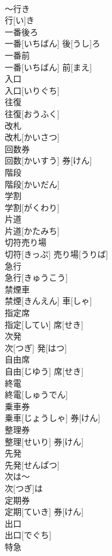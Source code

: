 \documentclass[8pt]{extreport}
\begin{document}
\begin{CJK}{UTF8}{min}
\\	～行き	
\\	行[い]き
\\	一番後ろ	
\\	一番[いちばん] 後[うし]ろ
\\	一番前	
\\	一番[いちばん] 前[まえ]
\\	入口	
\\	入口[いりぐち]
\\	往復	
\\	往復[おうふく]
\\	改札	
\\	改札[かいさつ]
\\	回数券	
\\	回数[かいすう] 券[けん]
\\	階段	
\\	階段[かいだん]
\\	学割	
\\	学割[がくわり]
\\	片道	
\\	片道[かたみち]
\\	切符売り場	
\\	切符[きっぷ] 売り場[うりば]
\\	急行	
\\	急行[きゅうこう]
\\	禁煙車	
\\	禁煙[きんえん] 車[しゃ]
\\	指定席	
\\	指定[してい] 席[せき]
\\	次発	
\\	次[つぎ] 発[はつ]
\\	自由席	
\\	自由[じゆう] 席[せき]
\\	終電	
\\	終電[しゅうでん]
\\	乗車券	
\\	乗車[じょうしゃ] 券[けん]
\\	整理券	
\\	整理[せいり] 券[けん]
\\	先発	
\\	先発[せんぱつ]
\\	次は～	
\\	次[つぎ]は~
\\	定期券	
\\	定期[ていき] 券[けん]
\\	出口	
\\	出口[でぐち]
\\	特急	

\end{CJK}
\end{document}
